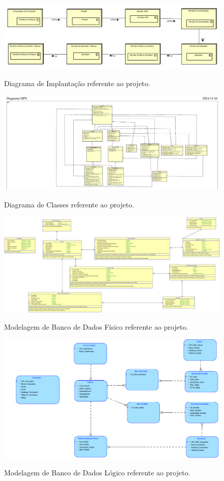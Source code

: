 \documentclass[12pt]{article}
\begin{document}
    \begin{figure}
        \centering
        \caption{Diagrama de Implantação referente ao projeto.}
        \includegraphics[width=0.8\linewidth]{figures/diagramaImplantacao.png}
        \label{fig:figura6}
    \end{figure}

    \begin{figure}
        \centering
        \caption{Diagrama de Classes referente ao projeto.}
        \includegraphics[width=0.8\linewidth]{figures/diagramaClasse.png}
        \label{fig:figura7}
    \end{figure}
 
    \begin{figure}
        \centering
        \caption{Modelagem de Banco de Dados Físico referente ao projeto.}
        \includegraphics[width=0.8\linewidth]{figures/modeloBDFisico.png}
        \label{fig:figura8}
    \end{figure}
    
    \begin{figure}
        \centering
        \caption{Modelagem de Banco de Dados Lógico referente ao projeto.}
        \includegraphics[width=0.8\linewidth]{figures/modeloBDLogico.png}
        \label{fig:figura9}
    \end{figure}
\end{document}
